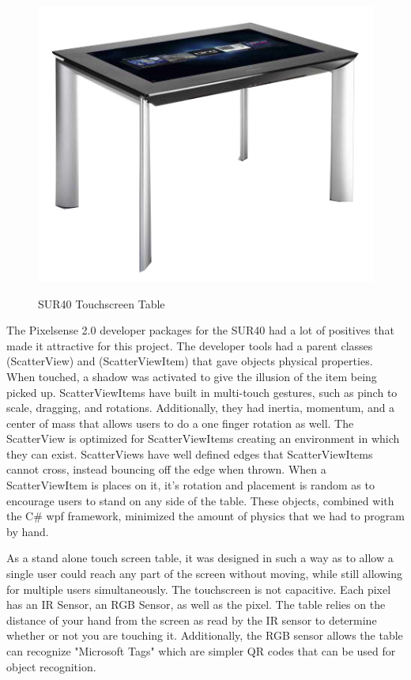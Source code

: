 \documentclass{article}
\begin{document}
\begin{figure}[t!]
\centering
\scalebox{1}
{\includegraphics{SUR40.jpg}}
\caption{SUR40 Touchscreen Table}
\label{Fig:table}
\end{figure}

The Pixelsense 2.0 developer packages for the SUR40 had a lot of positives that made it attractive for this project.    The developer tools had a parent classes (ScatterView) and (ScatterViewItem) that gave objects physical properties.  When touched, a shadow was activated to give the illusion of the item being picked up.  ScatterViewItems have built in multi-touch gestures, such as pinch to scale, dragging, and rotations. Additionally, they had inertia, momentum, and a center of mass that allows users to do a one finger rotation as well.  The ScatterView is optimized for ScatterViewItems creating an environment in which they can exist.  ScatterViews have well defined edges that ScatterViewItems cannot cross, instead bouncing off the edge when thrown.  When a ScatterViewItem is places on it, it's rotation and placement is random as to encourage users to stand on any side of the table.  These objects, combined with the C\# wpf framework, minimized the amount of physics that we had to program by hand.

As a stand alone touch screen table, it was designed in such a way as to allow a single user could reach any part of the screen without moving, while still allowing for multiple users simultaneously.  The touchscreen is not capacitive.  Each pixel has an IR Sensor, an RGB Sensor, as well as the pixel.  The table relies on the distance of your hand from the screen as read by the IR sensor to determine whether or not you are touching it.  Additionally, the RGB sensor allows the table can recognize "Microsoft Tags" which are simpler QR codes that can be used for object recognition.  
\end{document}
